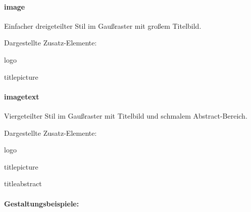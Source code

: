   \begin{minipage}[t]{0.33\textwidth}
    \null\centering\sffamily
  \end{minipage}%
  \hfill
  \begin{minipage}[t]{0.6\textwidth}
    \paragraph{image}
    
    Einfacher dreigeteilter Stil im Gaußraster mit großem Titelbild.
    \par\bigskip
    \par\bigskip
    Dargestellte Zusatz-Elemente:
    \begin{compactitem}\ttfamily
      \item logo
      \item titlepicture
    \end{compactitem}
  \end{minipage}
  
  \begin{minipage}[t]{0.33\textwidth}
    \null\centering\sffamily
  \end{minipage}
  \hfill
  \begin{minipage}[t]{0.6\textwidth}
    \paragraph{imagetext}
    
    Viergeteilter Stil im Gaußraster mit Titelbild und schmalem Abstract-Bereich.
    \par\bigskip
    \par\bigskip
    Dargestellte Zusatz-Elemente:
    \begin{compactitem}\ttfamily
      \item logo
      \item titlepicture
      \item titleabstract
    \end{compactitem}
  \end{minipage}

\paragraph{Gestaltungsbeispiele:}\hfill

